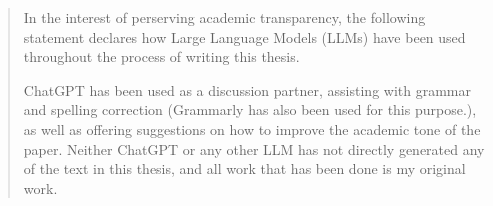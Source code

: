 \renewcommand{\abstractname}{AI Statement}
\begin{abstract}
    In the interest of perserving academic transparency, the following statement declares how Large Language Models (LLMs) have been used throughout the process of writing this thesis.
    \medskip

    ChatGPT has been used as a discussion partner, assisting with grammar and spelling correction (Grammarly has also been used for this purpose.), as well as offering suggestions on how to improve the academic tone of the paper. Neither ChatGPT or any other LLM has not directly generated any of the text in this thesis, and all work that has been done is my original work.
\end{abstract}
